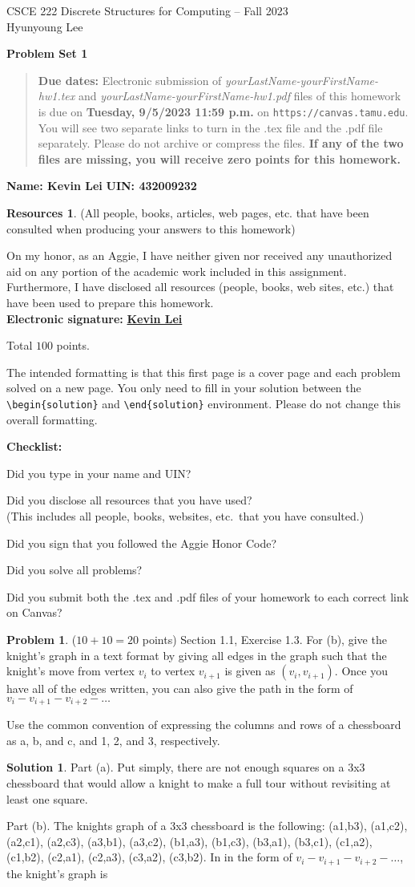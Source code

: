 \documentclass{article}
\theoremstyle{definition}
\newtheorem{problem}{Problem}
\newtheorem*{solution}{Solution}
\newtheorem*{resources}{Resources}
\newcommand{\name}[2]{\noindent\textbf{Name: #1}\hfill \textbf{UIN: #2}
  \newcommand{\myName}{#1}
  \newcommand{\myUIN}{#2}
}
\newcommand{\honor}{\noindent On my honor, as an Aggie, I have neither
  given nor received any unauthorized aid on any portion of the
  academic work included in this assignment. Furthermore, I have
  disclosed all resources (people, books, web sites, etc.) that have
  been used to prepare this homework. \\[2ex]
 \textbf{Electronic signature:} \underline{ \textbf{Kevin Lei} } } %
\newcommand{\checklist}{\noindent\textbf{Checklist:}
\begin{compactitem}[$\Box$] 
\item Did you type in your name and UIN? 
\item Did you disclose all resources that you have used? \\
(This includes all people, books, websites, etc.\ that you have consulted.)
\item Did you sign that you followed the Aggie Honor Code? 
\item Did you solve all problems? 
\item Did you submit both the .tex and .pdf files of your homework to each correct link on Canvas? 
\end{compactitem}
}
\newcommand{\problemset}[1]{\begin{center}\textbf{Problem Set #1}\end{center}}
\newcommand{\duedate}[1]{\begin{quote}\textbf{Due dates:} Electronic
    submission of \textsl{yourLastName-yourFirstName-hw1.tex} and 
    \textsl{yourLastName-yourFirstName-hw1.pdf} files of this homework is due on
    \textbf{#1} on \texttt{https://canvas.tamu.edu}. You will see two separate links
    to turn in the .tex file and the .pdf file separately. Please do not archive or compress the files.  
    \textbf{If any of the two files are missing, you will receive zero points for this homework.}\end{quote} }
\begin{document}
\begin{center}
{\large
CSCE 222 Discrete Structures for Computing -- Fall 2023\\[.5ex]
Hyunyoung Lee\\}
\end{center}
\problemset{1}
\duedate{Tuesday, 9/5/2023 11:59 p.m.}
\name{ Kevin Lei }{ 432009232 }  %

\begin{resources} (All people, books, articles, web pages, etc. that
  have been consulted when producing your answers to this homework)
\end{resources}
\honor

\bigskip

\noindent
Total $100$ points.

\bigskip

\noindent
The intended formatting is that this first page is a cover page and each 
problem solved on a new page. You only need to fill in your solution between 
the \verb|\begin{solution}| and \verb|\end{solution}| environment.  
Please do not change this overall formatting.

\vfill
\checklist

\newpage
\begin{problem} ($10+10=20$ points) Section 1.1, Exercise 1.3.
For (b), give the knight's graph in a text format by giving all
edges in the graph such that the knight's move from vertex $v_i$ to 
vertex $v_{i+1}$ is given as $(v_i, v_{i+1})$.  Once you have all of the
edges written, you can also give the path in the form of 
$v_i - v_{i+1} - v_{i+2} - \ldots$

Use the common convention of expressing the columns and rows of
a chessboard as a, b, and c, and 1, 2, and 3, respectively.
\end{problem}
\begin{solution}

Part (a). Put simply, there are not enough squares on a 3x3 chessboard that would allow a knight to make a full tour without revisiting at least one square.

Part (b). The knights graph of a 3x3 chessboard is the following: (a1,b3), (a1,c2), (a2,c1), (a2,c3), (a3,b1), (a3,c2), (b1,a3), (b1,c3), (b3,a1), (b3,c1), (c1,a2), (c1,b2), (c2,a1), (c2,a3), (c3,a2), (c3,b2). 
In in the form of $v_i - v_{i+1} - v_{i+2} - \ldots$, the knight's graph is 

\end{solution}
\end{document}
